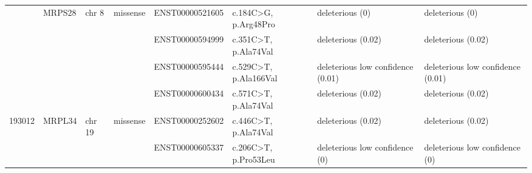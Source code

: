 \begin{landscape}
\begin{table}[]
{\begin{tabular}{|l|l|l|l|l|l|l|l|}
{\color[HTML]{000000} }                         & \multirow{-3}{*}{{\color[HTML]{000000} MRPS28}} & \multirow{-3}{*}{{\color[HTML]{000000} chr 8}}  & \multirow{-3}{*}{{\color[HTML]{000000} missense}} & {\color[HTML]{000000} ENST00000521605}     & {\color[HTML]{000000} c.184C\textgreater{}G, p.Arg48Pro}   & {\color[HTML]{000000} deleterious (0)}                   & deleterious (0)                   \\ \cline{2-8} 
{\color[HTML]{000000} }                         & {\color[HTML]{000000} }                         & {\color[HTML]{000000} }                         & {\color[HTML]{000000} }                           & {\color[HTML]{000000} ENST00000594999}     & {\color[HTML]{000000} c.351C\textgreater{}T, p.Ala74Val}   & {\color[HTML]{000000} deleterious (0.02)}                & deleterious (0.02)                \\ \cline{5-8} 
{\color[HTML]{000000} }                         & {\color[HTML]{000000} }                         & {\color[HTML]{000000} }                         & {\color[HTML]{000000} }                           & {\color[HTML]{000000} ENST00000595444}     & {\color[HTML]{000000} c.529C\textgreater{}T, p.Ala166Val}  & {\color[HTML]{000000} deleterious low confidence (0.01)} & deleterious low confidence (0.01) \\ \cline{5-8} 
{\color[HTML]{000000} }                         & {\color[HTML]{000000} }                         & {\color[HTML]{000000} }                         & {\color[HTML]{000000} }                           & {\color[HTML]{000000} ENST00000600434}     & {\color[HTML]{000000} c.571C\textgreater{}T, p.Ala74Val}   & {\color[HTML]{000000} deleterious (0.02)}                & deleterious (0.02)                \\ \cline{5-8} 
\multirow{-7}{*}{{\color[HTML]{000000} 193012}} & \multirow{-4}{*}{{\color[HTML]{000000} MRPL34}} & \multirow{-4}{*}{{\color[HTML]{000000} chr 19}} & \multirow{-4}{*}{{\color[HTML]{000000} missense}} & {\color[HTML]{000000} ENST00000252602}     & {\color[HTML]{000000} c.446C\textgreater{}T, p.Ala74Val}   & {\color[HTML]{000000} deleterious (0.02)}                & deleterious (0.02)                \\ \hline
{\color[HTML]{000000} }                         & {\color[HTML]{000000} }                         & {\color[HTML]{000000} }                         & {\color[HTML]{000000} }                           & {\color[HTML]{000000} ENST00000605337}     & {\color[HTML]{000000} c.206C\textgreater{}T, p.Pro53Leu}   & {\color[HTML]{000000} deleterious low confidence (0)}    & deleterious low confidence (0)    \\ \cline{5-8} 

\end{tabular}}
\end{table}
\end{landscape}

